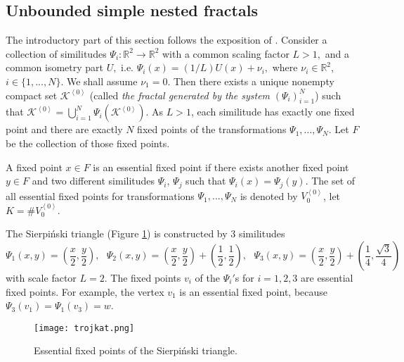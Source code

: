 \documentclass[11pt]{article}
\begin{document}
\subsection{Unbounded simple nested fractals} \label{sec:usnf}

The introductory part of this section follows the exposition of \cite{bib:Lin,bib:kpp-sausage,bib:kpp-sto}. Consider a collection of similitudes $\Psi_i : \mathbb{R}^2 \to \mathbb{R}^2$ with a common scaling factor $L>1,$  and a common isometry part $U,$ i.e. $\Psi_i(x) = (1/L) U(x) + \nu_i,$  where  $\nu_i \in \mathbb{R}^2$, $i \in \{1, ..., N\}.$ We shall assume $\nu_1 = 0$. Then
there exists a unique nonempty compact set $\mathcal{K}^{\left\langle 0\right\rangle}$ (called {\em the  fractal generated by the system} $(\Psi_i)_{i=1}^N$) such that $\mathcal{K}^{\left\langle 0\right\rangle} = \bigcup_{i=1}^{N} \Psi_i\left(\mathcal{K}^{\left\langle 0\right\rangle}\right)$.  As $L>1$, each similitude has exactly one fixed point and there are exactly $N$ fixed points of the transformations $\Psi_1, ..., \Psi_N$. Let $F$ be the collection of those fixed points.


\begin{defi}
A fixed point $x \in F$ is an essential fixed point if there exists another fixed point $y \in F$ and two different similitudes $\Psi_i$, $\Psi_j$ such that $\Psi_i(x)=\Psi_j(y)$.
The set of all essential fixed points for transformations $\Psi_1, ..., \Psi_N$ is denoted by $V_{0}^{\left\langle 0\right\rangle}$, let $K=\# V^{\left\langle 0\right\rangle}_{0}$.
\end{defi}

\begin{exam}
The Sierpi\'nski triangle (Figure \ref{fig:essfix}) is constructed by 3 similitudes
$$
\Psi_1(x,y) =(\frac{x}{2},\frac{y}{2}), \mbox{ } \Psi_2(x,y) =(\frac{x}{2},\frac{y}{2}) + (\frac{1}{2},\frac{1}{2}), \mbox{ } \Psi_3(x,y) =(\frac{x}{2},\frac{y}{2}) + (\frac{1}{4},\frac{\sqrt{3}}{4})
$$
with scale factor $L = 2.$ The fixed points $v_i$ of the $\Psi_i'$s for $i=1,2,3$ are essential fixed points. For example, the vertex $v_1$ is an essential fixed point, because $\Psi_3(v_1) = \Psi_1(v_3)=w$.
\end{exam}

\begin{figure}[ht]
\centering
	\texttt{[image: trojkat.png]}
\caption{Essential fixed points of the Sierpi\'nski triangle.}
\label{fig:essfix}
\end{figure}
\end{document}
